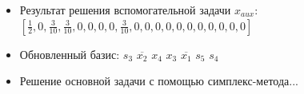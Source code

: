 \begin{itemize}
\begin{itemize}
\item \textbf{Вектор $y = c_B \cdot B^{-1}$:}
$[0, 0, 0, -1, 0, 1, 0]$
\item \textbf{Оценки $\Delta = c - y \cdot A$:}
$[0, 0, 0, 0, 0, 0, 0, 0, 0, 1, 0, 1, 0, 1, 1, 1, 2, 1, 0, 1]$
\item \textbf{Оптимальное решение найдено.}
\item \textbf{Решение $x$:}
$[\frac{1}{2}, 0, \frac{3}{10}, \frac{3}{10}, 0, 0, 0, 0, \frac{3}{10}, 0, 0, 0, 0, 0, 0, 0, 0, 0, 0, 0]$
\end{itemize}
\item Результат решения вспомогательной задачи $x_{aux}$:
$[\frac{1}{2}, 0, \frac{3}{10}, \frac{3}{10}, 0, 0, 0, 0, \frac{3}{10}, 0, 0, 0, 0, 0, 0, 0, 0, 0, 0, 0]$
\item Обновленный базис:
$s_3$
$\overline{x_2}$
$x_4$
$x_3$
$\overline{x_1}$
$s_5$
$s_4$
\newpage
\item Решение основной задачи с помощью симплекс-метода...

\end{itemize}
